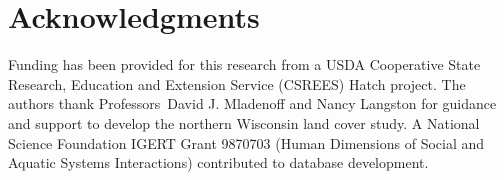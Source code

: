 \documentclass[authoryear,review, 12pt]{elsarticle}
\begin{document}


\section*{Acknowledgments}

Funding has been provided for this research from a USDA Cooperative State Research, Education and Extension Service (CSREES) Hatch project.
The authors thank Professors~David J. Mladenoff and Nancy Langston for guidance and support to develop the northern Wisconsin land cover study.  A National Science Foundation IGERT Grant 9870703 (Human Dimensions of Social and Aquatic Systems Interactions) contributed to database development.
\end{document}
